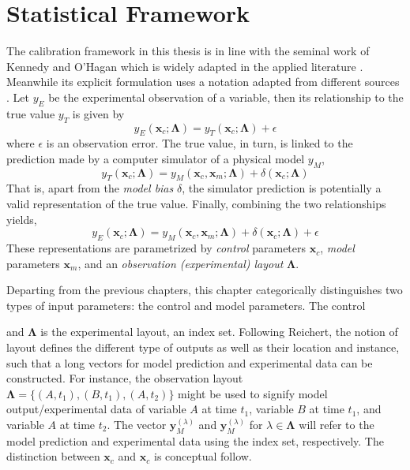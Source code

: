 \section{Statistical Framework}\label{sec:bc_statistical_framework}

The calibration framework in this thesis is in line with the seminal work of Kennedy and O'Hagan \cite{Kennedy2001} which is widely adapted in the applied literature \cite{Bayarri2007,Higdon2008,Arendt2012,Reichert2012}.
Meanwhile its explicit formulation uses a notation adapted from different sources \cite{Kennedy2001,Santner2003,Reichert2012}.
Let $y_E$ be the experimental observation of a variable,
then its relationship to the true value $y_T$ is given by
\begin{equation}
    y_E(\bm{x}_c; \boldsymbol{\Lambda}) = y_T (\bm{x}_c; \boldsymbol{\Lambda}) + \epsilon
\label{eq:bc_observation_true}
\end{equation}
where $\epsilon$ is an observation error.
The true value, in turn, is linked to the prediction made by a computer simulator of a physical model $y_M$,
\begin{equation}
    y_T(\bm{x}_c; \boldsymbol{\Lambda}) = y_M (\bm{x}_c, \bm{x}_m; \boldsymbol{\Lambda}) + \delta (\bm{x}_c; \boldsymbol{\Lambda})
\label{eq:bc_true_simulation}
\end{equation}
That is, apart from the \emph{model bias} $\delta$, the simulator prediction is potentially a valid representation of the true value.
Finally, combining the two relationships yields,
\begin{equation}
    y_E(\bm{x}_c; \boldsymbol{\Lambda}) = y_M (\bm{x}_c, \bm{x}_m; \boldsymbol{\Lambda}) + \delta (\bm{x}_c; \boldsymbol{\Lambda}) + \epsilon
\label{eq:bc_observation_true}
\end{equation}
These representations are parametrized by \emph{control} parameters $\bm{x}_c$,
\emph{model} parameters $\bm{x}_m$, and an \emph{observation (experimental) layout} $\boldsymbol{\Lambda}$.

Departing from the previous chapters, this chapter categorically distinguishes two types of input parameters: the control and model parameters.
The control 

and $\boldsymbol{\Lambda}$ is the experimental layout, an index set.
Following Reichert, the notion of layout defines the different type of outputs as well as their location and instance, such that a long vectors for model prediction and experimental data can be constructed.
For instance, the observation layout $\boldsymbol{\Lambda} = \{(A,t_1), (B,t_1), (A, t_2)\}$ might be used to signify model output/experimental data of variable $A$ at time $t_1$, variable $B$ at time $t_1$, and variable $A$ at time $t_2$.
The vector $\bm{y}^{(\lambda)}_M$ and $\bm{y}^{(\lambda)}_M$ for $\lambda \in \boldsymbol{\Lambda}$ will refer to the model prediction and experimental data using the index set, respectively.
The distinction between $\bm{x}_c$ and $\bm{x}_c$ is conceptual follow.

